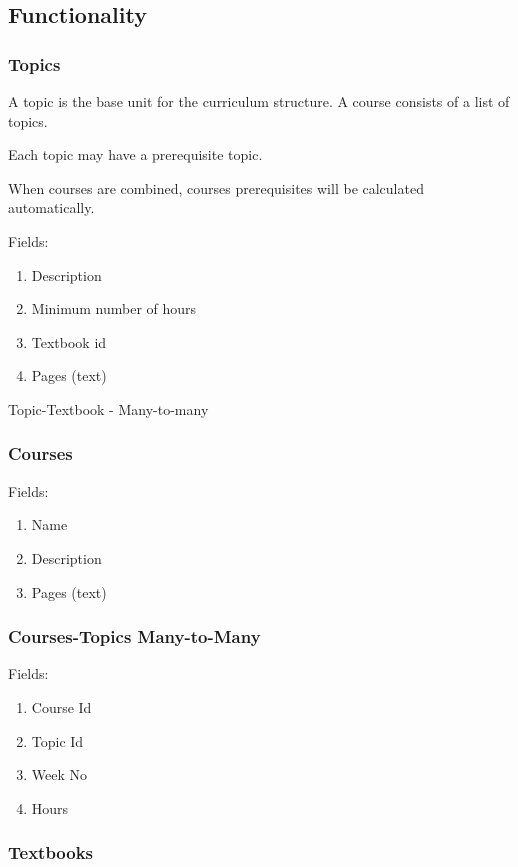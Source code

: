 \subsection{Functionality}





\subsubsection{Topics}

A topic is the base unit for the curriculum structure. A course consists of a list of topics. 

Each topic may have a prerequisite topic.

When courses are combined, courses prerequisites will be calculated automatically.

Fields:
\begin{enumerate}
\item Description
\item Minimum number of hours
\item Textbook id
\item Pages (text)
\end{enumerate}

Topic-Textbook - Many-to-many

\subsubsection{Courses}

Fields:
\begin{enumerate}
\item Name
\item Description
\item Pages (text)
\end{enumerate}


\subsubsection{Courses-Topics Many-to-Many}
Fields:
\begin{enumerate}
\item Course Id
\item Topic Id
\item Week No
\item Hours
\end{enumerate}

\subsubsection{Textbooks}

